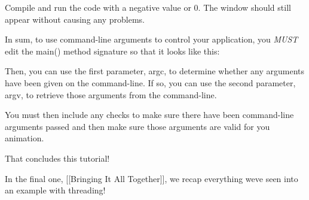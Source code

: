 Compile and run the code with a negative value or 0. The window should still appear without causing any problems.

In sum, to use command-\/line arguments to control your application, you {\itshape M\+U\+ST} edit the {\ttfamily main()} method signature so that it looks like this\+:


\begin{DoxyCode}{0}
\DoxyCodeLine{}
\DoxyCodeLine{\}}
\end{DoxyCode}


Then, you can use the first parameter, {\ttfamily argc}, to determine whether any arguments have been given on the command-\/line. If so, you can use the second parameter, {\ttfamily argv}, to retrieve those arguments from the command-\/line.

You must then include any checks to make sure there have been command-\/line arguments passed and then make sure those arguments are valid for you animation.

That concludes this tutorial!

In the final one, \mbox{[}\mbox{[}Bringing It All Together\mbox{]}\mbox{]}, we recap everything we\textquotesingle{}ve seen into an example with threading! 
